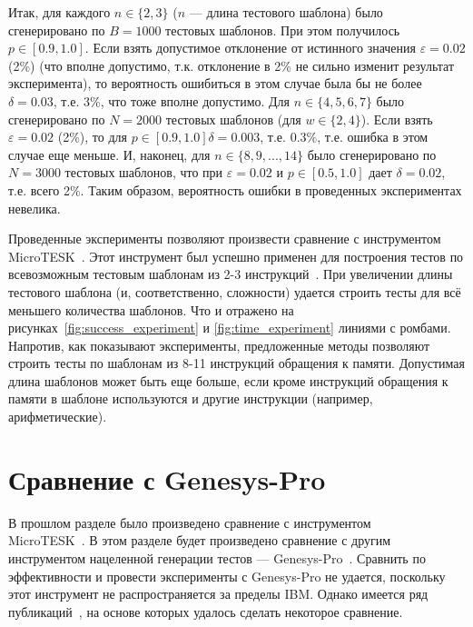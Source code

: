 Итак, для каждого $n \in \{2,3\}$ ($n$ --- длина тестового шаблона) было сгенерировано по $B = 1000$ тестовых шаблонов. При этом получилось $p \in [0.9, 1.0]$. Если взять допустимое отклонение от истинного значения $\varepsilon = 0.02$ (2\%) (что вполне допустимо, т.к. отклонение в 2\% не сильно изменит результат эксперимента), то вероятность ошибиться в этом случае была бы не более $\delta = 0.03$, т.е. 3\%, что тоже вполне допустимо. Для $n \in \{4, 5, 6, 7\}$ было сгенерировано по $N = 2000$ тестовых шаблонов (для $w \in \{2,4\}$). Если взять $\varepsilon = 0.02$ (2\%), то для $p \in [0.9, 1.0] \delta = 0.003$, т.е. $0.3\%$, т.е. ошибка в этом случае еще меньше. И, наконец, для $n \in \{8, 9, ..., 14\}$ было сгенерировано по $N = 3000$ тестовых шаблонов, что при $\varepsilon = 0.02$ и $p \in [0.5, 1.0]$ дает $\delta = 0.02$, т.е. всего 2\%. Таким образом, вероятность ошибки в проведенных экспериментах невелика.

Проведенные эксперименты позволяют произвести сравнение с инструментом
MicroTESK~\cite{MicroTESK}. Этот инструмент был успешно применен для построения
тестов по всевозможным тестовым шаблонам из 2-3 инструкций~\cite{vorobyev}. При
увеличении длины тестового шаблона (и, соответственно, сложности) удается
строить тесты для всё меньшего количества шаблонов. Что и отражено на
рисунках~\ref{fig:success_experiment} и \ref{fig:time_experiment} линиями с
ромбами. Напротив, как показывают эксперименты, предложенные методы позволяют
строить тесты по шаблонам из 8-11 инструкций обращения к памяти. Допустимая
длина шаблонов может быть еще больше, если кроме инструкций обращения к памяти в
шаблоне используются и другие инструкции (например, арифметические).

\section{Сравнение с Genesys-Pro}

В прошлом разделе было произведено сравнение с инструментом\\
MicroTESK~\cite{MicroTESK}. В этом разделе будет произведено сравнение с другим
инструментом нацеленной генерации тестов --- Genesys-Pro~\cite{GenesysPro}. Сравнить
по эффективности и провести эксперименты с Genesys-Pro не удается, поскольку
этот инструмент не распространяется за пределы IBM. Однако имеется ряд
публикаций~\cite{GenesysPro2004Innovations, GenesysSolver}, на основе которых удалось сделать некоторое сравнение.

